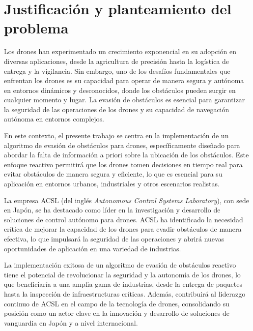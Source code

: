 \section{Justificación y planteamiento del problema}

    \par Los drones han experimentado un crecimiento exponencial en su adopción en diversas aplicaciones, desde la agricultura de precisión hasta la logística de entrega y la vigilancia. Sin embargo, uno de los desafíos fundamentales que enfrentan los drones es su capacidad para operar de manera segura y autónoma en entornos dinámicos y desconocidos, donde los obstáculos pueden surgir en cualquier momento y lugar. La evasión de obstáculos es esencial para garantizar la seguridad de las operaciones de los drones y su capacidad de navegación autónoma en entornos complejos.

    \par En este contexto, el presente trabajo se centra en la implementación de un algoritmo de evasión de obstáculos para drones, específicamente diseñado para abordar la falta de información a priori sobre la ubicación de los obstáculos. Este enfoque reactivo permitirá que los drones tomen decisiones en tiempo real para evitar obstáculos de manera segura y eficiente, lo que es esencial para su aplicación en entornos urbanos, industriales y otros escenarios realistas.

    \par La empresa ACSL (del inglés \textit{Autonomous Control Systems Laboratory}), con sede en Japón, se ha destacado como líder en la investigación y desarrollo de soluciones de control autónomo para drones. ACSL ha identificado la necesidad crítica de mejorar la capacidad de los drones para evadir obstáculos de manera efectiva, lo que impulsará la seguridad de las operaciones y abrirá nuevas oportunidades de aplicación en una variedad de industrias.

    \par La implementación exitosa de un algoritmo de evasión de obstáculos reactivo tiene el potencial de revolucionar la seguridad y la autonomía de los drones, lo que beneficiaría a una amplia gama de industrias, desde la entrega de paquetes hasta la inspección de infraestructuras críticas. Además, contribuirá al liderazgo continuo de ACSL en el campo de la tecnología de drones, consolidando su posición como un actor clave en la innovación y desarrollo de soluciones de vanguardia en Japón y a nivel internacional.
        

